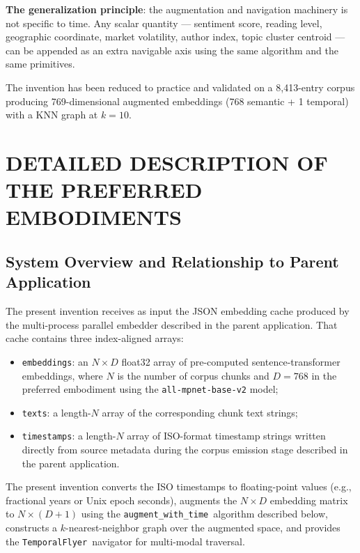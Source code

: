 \documentclass[12pt,letterpaper]{article}
\newcommand{\temporalflyer}{\texttt{TemporalFlyer}}
\newcommand{\augtime}{\texttt{augment\_with\_time}}
\begin{document}
\textbf{The generalization principle}: the augmentation and navigation machinery
is not specific to time. Any scalar quantity --- sentiment score, reading level,
geographic coordinate, market volatility, author index, topic cluster centroid
--- can be appended as an extra navigable axis using the same algorithm and the
same primitives.

The invention has been reduced to practice and validated on a 8,413-entry
corpus producing 769-dimensional augmented embeddings (768 semantic + 1
temporal) with a KNN graph at $k = 10$.

\section{DETAILED DESCRIPTION OF THE PREFERRED EMBODIMENTS}

\subsection{System Overview and Relationship to Parent Application}

The present invention receives as input the JSON embedding cache produced by
the multi-process parallel embedder described in the parent application. That
cache contains three index-aligned arrays:

\begin{itemize}[noitemsep]
  \item \texttt{embeddings}: an $N \times D$ float32 array of pre-computed
    sentence-transformer embeddings, where $N$ is the number of corpus chunks
    and $D = 768$ in the preferred embodiment using the
    \texttt{all-mpnet-base-v2} model;
  \item \texttt{texts}: a length-$N$ array of the corresponding chunk text
    strings;
  \item \texttt{timestamps}: a length-$N$ array of ISO-format timestamp strings
    written directly from source metadata during the corpus emission stage
    described in the parent application.
\end{itemize}

The present invention converts the ISO timestamps to floating-point values
(e.g., fractional years or Unix epoch seconds), augments the $N \times D$
embedding matrix to $N \times (D+1)$ using the \augtime\ algorithm described
below, constructs a $k$-nearest-neighbor graph over the augmented space, and
provides the \temporalflyer\ navigator for multi-modal traversal.
\end{document}
